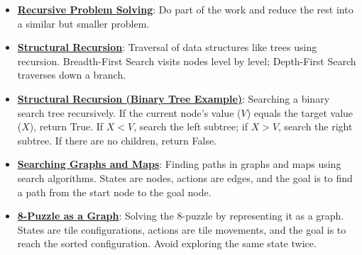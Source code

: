 \documentclass{article}%
\begin{document}
\begin{itemize}[leftmargin=*]%
\item \href{https://purdue.brightspace.com/d2l/common/assets/pdfjs-d2l-dist/1.0.14-legacy/web/viewer.html?file=\%2Fcontent\%2Fenforced\%2F1095467-wl.202510.CS.24300.001\%2F14L1-DepthFS.pdf\%3Fou\%3D1095467\&lang=en-us\&container=d2l-fileviewer-rendered-pdf\&fullscreen=d2l-fileviewer-rendered-pdf-dialog\&height=667#page=4}{\textbf{Recursive Problem Solving}}: Do part of the work and reduce the rest into a similar but smaller problem.%
\item \href{https://purdue.brightspace.com/d2l/common/assets/pdfjs-d2l-dist/1.0.14-legacy/web/viewer.html?file=\%2Fcontent\%2Fenforced\%2F1095467-wl.202510.CS.24300.001\%2F14L1-DepthFS.pdf\%3Fou\%3D1095467\&lang=en-us\&container=d2l-fileviewer-rendered-pdf\&fullscreen=d2l-fileviewer-rendered-pdf-dialog\&height=667#page=8}{\textbf{Structural Recursion}}: Traversal of data structures like trees using recursion. Breadth-First Search visits nodes level by level; Depth-First Search traverses down a branch.%
\item \href{https://purdue.brightspace.com/d2l/common/assets/pdfjs-d2l-dist/1.0.14-legacy/web/viewer.html?file=\%2Fcontent\%2Fenforced\%2F1095467-wl.202510.CS.24300.001\%2F14L1-DepthFS.pdf\%3Fou\%3D1095467\&lang=en-us\&container=d2l-fileviewer-rendered-pdf\&fullscreen=d2l-fileviewer-rendered-pdf-dialog\&height=667#page=10}{\textbf{Structural Recursion (Binary Tree Example)}}: Searching a binary search tree recursively. If the current node's value ($V$) equals the target value ($X$), return True. If $X < V$, search the left subtree; if $X > V$, search the right subtree. If there are no children, return False.%
\item \href{https://purdue.brightspace.com/d2l/common/assets/pdfjs-d2l-dist/1.0.14-legacy/web/viewer.html?file=\%2Fcontent\%2Fenforced\%2F1095467-wl.202510.CS.24300.001\%2F14L1-DepthFS.pdf\%3Fou\%3D1095467\&lang=en-us\&container=d2l-fileviewer-rendered-pdf\&fullscreen=d2l-fileviewer-rendered-pdf-dialog\&height=667#page=25}{\textbf{Searching Graphs and Maps}}: Finding paths in graphs and maps using search algorithms. States are nodes, actions are edges, and the goal is to find a path from the start node to the goal node.%
\item \href{https://purdue.brightspace.com/d2l/common/assets/pdfjs-d2l-dist/1.0.14-legacy/web/viewer.html?file=\%2Fcontent\%2Fenforced\%2F1095467-wl.202510.CS.24300.001\%2F14L1-DepthFS.pdf\%3Fou\%3D1095467\&lang=en-us\&container=d2l-fileviewer-rendered-pdf\&fullscreen=d2l-fileviewer-rendered-pdf-dialog\&height=667#page=29}{\textbf{8{-}Puzzle as a Graph}}: Solving the 8-puzzle by representing it as a graph. States are tile configurations, actions are tile movements, and the goal is to reach the sorted configuration. Avoid exploring the same state twice.%

\end{itemize}
\end{document}
